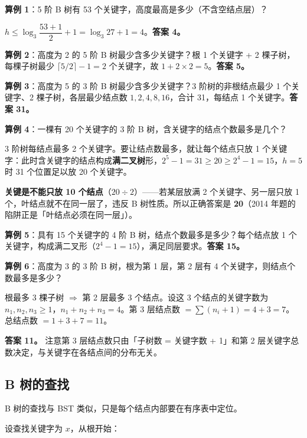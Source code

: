 \documentclass[11pt,openany,UTF8]{ctexbook}
\begin{document}
\textbf{算例 1}：5 阶 B 树有 53 个关键字，高度最高是多少（不含空结点层）？

$h\le \log_3\dfrac{53+1}{2}+1=\log_3 27+1=4$。\textbf{答案 4。}

\textbf{算例 2}：高度为 2 的 5 阶 B 树最少含多少关键字？根 1 个关键字 + 2 棵子树，每棵子树最少 $\lceil 5/2\rceil-1=2$ 个关键字，故 $1+2\times2=5$。\textbf{答案 5。}

\textbf{算例 3}：高度为 5 的 3 阶 B 树最少含多少关键字？3 阶树的非根结点最少 1 个关键字、2 棵子树，各层最少结点数 $1,2,4,8,16$，合计 31，每结点 1 个关键字。\textbf{答案 31。}

\textbf{算例 4}：一棵有 20 个关键字的 3 阶 B 树，含关键字的结点个数最多是几个？

3 阶树每结点最多 2 个关键字。要让结点数最多，就让每个结点只放 1 个关键字：此时含关键字的结点构成\textbf{满二叉树}形，$2^5-1=31\ge 20\ge 2^4-1=15$，$h=5$ 时 31 个位置足以放 20 个关键字。

\textbf{关键是不能只放 10 个结点}（$20\div2$）——若某层放满 2 个关键字、另一层只放 1 个，叶结点就不在同一层了，违反 B 树性质。所以正确答案是 \textbf{20}（2014 年题的陷阱正是「叶结点必须在同一层」）。

\textbf{算例 5}：具有 15 个关键字的 4 阶 B 树，结点个数最多是多少？每个结点放 1 个关键字，构成满二叉形（$2^4-1=15$），满足同层要求。\textbf{答案 15。}

\textbf{算例 6}：高度为 3 的 3 阶 B 树，根为第 1 层，第 2 层有 4 个关键字，则结点个数最多是多少？

根最多 3 棵子树 $\Rightarrow$ 第 2 层最多 3 个结点。设这 3 个结点的关键字数为 $n_1,n_2,n_3\ge1$，$n_1+n_2+n_3=4$。第 3 层结点数 $=\sum(n_i+1)=4+3=7$。总结点数 $=1+3+7=11$。

\textbf{答案 11。} 注意第 3 层结点数只由「子树数 = 关键字数 + 1」和第 2 层关键字总数决定，与关键字在各结点间的分布无关。

\subsection{B 树的查找}

B 树的查找与 BST 类似，只是每个结点内部要在有序表中定位。

设查找关键字为 $x$，从根开始：
\end{document}
